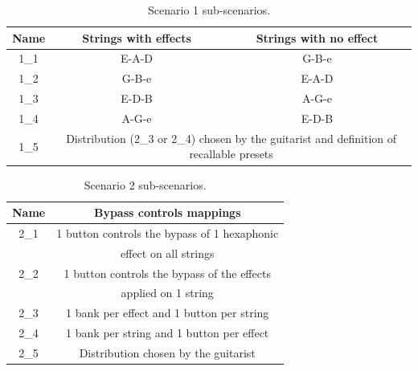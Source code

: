 \documentclass{article}
\begin{document}
\begin{table}
  
  \label{tab:scenario1}
  \begin{tabular}{ccc}
    \toprule
    Name &Strings with effects&Strings with no effect\\
    \midrule
    1\_1 & E-A-D & G-B-e\\
    1\_2 & G-B-e& E-A-D\\
    1\_3 & E-D-B & A-G-e\\
    1\_4 & A-G-e& E-D-B\\
    1\_5 & \multicolumn{2}{c}{Distribution (2\_3 or 2\_4) chosen by the \newline guitarist and definition of recallable presets}  \\
  \bottomrule
\end{tabular}
	\caption{Scenario 1 sub-scenarios.}
\end{table}

\begin{table}
  
  \label{tab:scenario2}
  \begin{tabular}{cc}
    \toprule
    Name & Bypass controls mappings\\
    \midrule
    2\_1 & 1 button controls the bypass of 1 hexaphonic \\
    & effect on all strings\\
    2\_2 & 1 button controls the bypass of the effects \\
    & applied on 1 string \\
    2\_3 & 1 bank per effect and 1 button per string\\
    2\_4 & 1 bank per string and 1 button per effect\\
    2\_5 & Distribution chosen by the guitarist  \\
  \bottomrule
\end{tabular}
	\caption{Scenario 2 sub-scenarios.}

\end{table}
\end{document}
